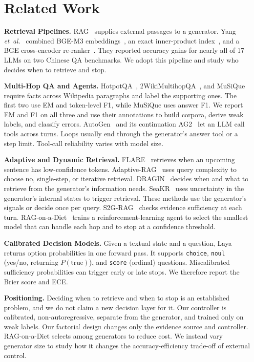 \section{Related Work}
\label{sec:related}

\textbf{Retrieval Pipelines.} RAG~\cite{lewis2020rag} supplies external passages to a
generator. Yang \emph{et~al.}~\cite{yang2025enhancing} combined BGE-M3
embeddings~\cite{chen2024bgem3}, an exact inner-product index~\cite{douze2024faiss}, and a
BGE cross-encoder re-ranker~\cite{chen2024bgem3,bgerankerv2m3}. They reported accuracy
gains for nearly all of 17 LLMs on two Chinese QA benchmarks. We adopt this pipeline and
study who decides when to retrieve and stop.

\textbf{Multi-Hop QA and Agents.} HotpotQA~\cite{yang2018hotpotqa},
2WikiMultihopQA~\cite{ho2020twowiki}, and MuSiQue~\cite{trivedi2022musique} require facts
across Wikipedia paragraphs and label the supporting ones. The first two
use EM and token-level F1, while MuSiQue uses answer F1. We report EM and F1 on all
three and use their annotations to build corpora, derive weak labels, and classify
errors. AutoGen~\cite{wu2024autogen} and its continuation AG2~\cite{ag2} let an LLM call
tools across turns. Loops usually end through the generator's answer tool or a step
limit. Tool-call reliability varies with model size.

\textbf{Adaptive and Dynamic Retrieval.} FLARE~\cite{jiang2023flare} retrieves when an
upcoming sentence has low-confidence tokens. Adaptive-RAG~\cite{jeong2024adaptiverag}
uses query complexity to choose no, single-step, or iterative retrieval.
DRAGIN~\cite{su2024dragin} decides when and what to retrieve from the generator's
information needs. SeaKR~\cite{yao2025seakr} uses uncertainty in the generator's internal
states to trigger retrieval. These methods use the generator's signals or decide once per
query. S2G-RAG~\cite{li2026s2grag} checks evidence sufficiency at each turn.
RAG-on-a-Diet~\cite{ding2026ragdiet} trains a reinforcement-learning agent to select the
smallest model that can handle each hop and to stop at a confidence threshold.

\textbf{Calibrated Decision Models.} Given a textual state and a question,
Laya~\cite{laya} returns option probabilities in one forward pass. It supports
\texttt{choice}, \texttt{noul} (yes/no, returning $P(\text{true})$), and \texttt{score}
(ordinal) questions. Miscalibrated sufficiency probabilities can trigger early or late
stops. We therefore report the Brier score and ECE.

\textbf{Positioning.} Deciding when to retrieve and when to stop is an established
problem, and we do not claim a new decision layer for it. Our controller is calibrated,
non-autoregressive, separate from the generator, and trained only on weak labels. Our
factorial design changes only the evidence source and controller. RAG-on-a-Diet selects
among generators to reduce cost. We instead vary generator size to study how it changes
the accuracy-efficiency trade-off of external control.
